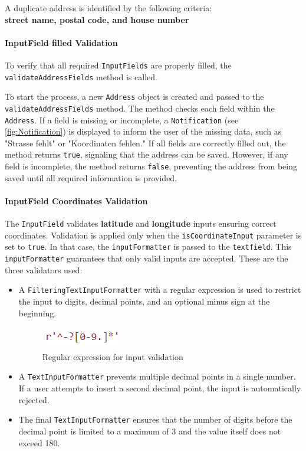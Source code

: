     A duplicate address is identified by the following criteria:\\
    \textbf{street name, postal code, and house number}
    


\newpage

\paragraph{InputField filled Validation}
To verify that all required \texttt{InputFields} are properly filled, the \texttt{validateAddressFields} method is called.

To start the process, a new \texttt{Address} object is created and passed to the \texttt{validateAddressFields} method. The method checks each field within the \texttt{Address}. If a field is missing or incomplete, a \texttt{Notification} (see \ref{fig:Notification}) is displayed to inform the user of the missing data, such as "Strasse fehlt" or "Koordinaten fehlen." If all fields are correctly filled out, the method returns \texttt{true}, signaling that the address can be saved. However, if any field is incomplete, the method returns \texttt{false}, preventing the address from being saved until all required information is provided.



\paragraph{InputField Coordinates Validation}
\label{fig:InputField Coordinates Validation}
    The \texttt{InputField} validates \textbf{latitude} and \textbf{longitude} inputs ensuring correct coordinates. Validation is applied only when the \texttt{isCoordinateInput} parameter is set to \texttt{true}. In that case, the \texttt{inputFormatter} is passed to the \texttt{textfield}. This \texttt{inputFormatter} guarantees that only valid inputs are accepted. These are the three validators used:


    \begin{itemize}
        \item A \texttt{FilteringTextInputFormatter} with a regular expression is used to restrict the input to digits, decimal points, and an optional minus sign at the beginning.
        \begin{figure}[H]
            \centering
            \includegraphics[width=0.2\linewidth]{images/AdminPanel/regexInputFormatter.png}
            \caption{Regular expression for input validation}
        \end{figure}
        \item A \texttt{TextInputFormatter} prevents multiple decimal points in a single number. If a user attempts to insert a second decimal point, the input is automatically rejected.
        \item The final \texttt{TextInputFormatter} ensures that the number of digits before the decimal point is limited to a maximum of 3 and the value itself does not exceed 180.
    \end{itemize}
    
